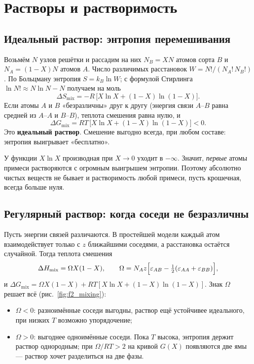 \chapter{Растворы и растворимость}\label{ch:solutions}

\section{Идеальный раствор: энтропия перемешивания}

Возьмём $N$ узлов решётки и рассадим на них $N_B = XN$ атомов сорта $B$ и $N_A = (1-X)N$ атомов $A$. Число
различимых расстановок $W = N!/(N_A!\,N_B!)$. По Больцману энтропия $S = k_B\ln W$; с формулой Стирлинга
$\ln N! \approx N\ln N - N$ получаем на моль
\begin{equation}
\Delta S_{\text{mix}} = -R\,\bigl[X\ln X + (1-X)\ln(1-X)\bigr] .
\end{equation}
Если атомы $A$ и $B$ «безразличны» друг к другу (энергия связи $A$--$B$ равна средней из $A$--$A$ и $B$--$B$),
теплота смешения равна нулю, и
\begin{equation}
\Delta G_{\text{mix}} = RT\,\bigl[X\ln X + (1-X)\ln(1-X)\bigr] < 0 .
\end{equation}
Это \textbf{идеальный раствор}. Смешение выгодно всегда, при любом составе: энтропия выигрывает «бесплатно».

\begin{idea}
У функции $X\ln X$ производная при $X\to 0$ уходит в $-\infty$. Значит, \emph{первые} атомы примеси растворяются
с огромным выигрышем энтропии. Поэтому абсолютно чистых веществ не бывает и растворимость любой примеси, пусть
крошечная, всегда больше нуля.
\end{idea}

\section{Регулярный раствор: когда соседи не безразличны}

Пусть энергии связей различаются. В простейшей модели каждый атом взаимодействует только с $z$ ближайшими
соседями, а расстановка остаётся случайной. Тогда теплота смешения
\begin{equation}
\Delta H_{\text{mix}} = \Omega X(1-X),\qquad
\Omega = N_A z\Bigl[\varepsilon_{AB} - \tfrac12(\varepsilon_{AA}+\varepsilon_{BB})\Bigr],
\end{equation}
и $\Delta G_{\text{mix}} = \Omega X(1-X) + RT[X\ln X + (1-X)\ln(1-X)]$. Знак $\Omega$ решает всё
(рис.~\ref{fig:f2_mixing}):
\begin{itemize}
\item $\Omega < 0$: разноимённые соседи выгодны, раствор ещё устойчивее идеального, при низких $T$ возможно упорядочение;
\item $\Omega > 0$: выгоднее одноимённые соседи. Пока $T$ высока, энтропия держит раствор однородным; при
  $\Omega/RT > 2$ на кривой $G(X)$ появляются две ямы --- раствор хочет разделиться на две фазы.
\end{itemize}

